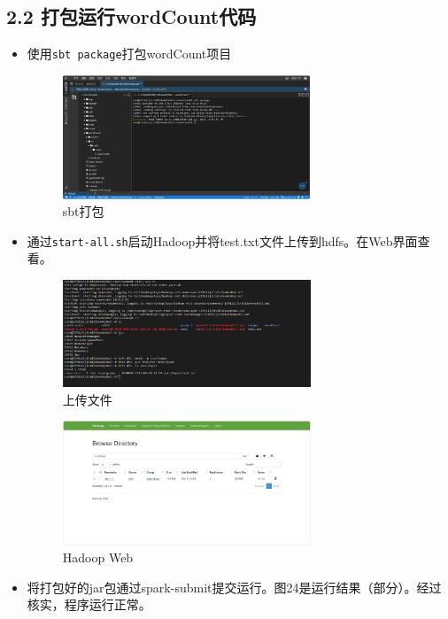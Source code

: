 \documentclass{article}
\begin{document}
\subsection*{2.2 打包运行wordCount代码}
\begin{itemize}
    \item 使用\lstinline[language=bash]|sbt package|打包wordCount项目
    \begin{figure}[H]
        \centering
        \includegraphics[width=0.7\textwidth]{./pic/24.jpg}
        \caption{sbt打包}
    \end{figure}
    \item 通过\lstinline[language=bash]|start-all.sh|启动Hadoop并将test.txt文件上传到hdfs。在Web界面查看。
    \begin{figure}[H]
        \centering
        \includegraphics[width=0.7\textwidth]{./pic/22.jpg}
        \caption{上传文件}
    \end{figure}
    \begin{figure}[H]
        \centering
        \includegraphics[width=0.7\textwidth]{./pic/23.jpg}
        \caption{Hadoop Web}
    \end{figure}
    \item 将打包好的jar包通过spark-submit提交运行。图24是运行结果（部分）。经过核实，程序运行正常。

\end{itemize}
\end{document}
